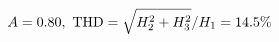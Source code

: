 \documentclass[preview]{standalone}
\begin{document}
\begin{align*}
\special{dvisvgm:raw <g id='unique000'>}A=0.80,\ \text{THD}=\sqrt{H_2^2+H_3^2}/H_1=14.5\%\special{dvisvgm:raw </g>}
\end{align*}
\end{document}
